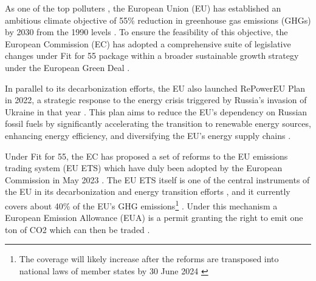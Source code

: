 \documentclass[preprint, 3p,
authoryear]{elsarticle} %
\begin{document}
As one of the top polluters \citep{unep_emissions_2023}, the European
Union (EU) has established an ambitious climate objective of 55\%
reduction in greenhouse gas emissions (GHGs) by 2030 from the 1990
levels \citep[Art 4(1)]{regulation_2021_1119}. To ensure the feasibility
of this objective, the European Commission (EC) has adopted a
comprehensive suite of legislative changes under Fit for 55 package
within a broader sustainable growth strategy under the European Green
Deal \citep{delivering_2021}.

In parallel to its decarbonization efforts, the EU also launched
RePowerEU Plan in 2022, a strategic response to the energy crisis
triggered by Russia's invasion of Ukraine in that year
\citep{communication_2022}. This plan aims to reduce the EU's dependency
on Russian fossil fuels by significantly accelerating the transition to
renewable energy sources, enhancing energy efficiency, and diversifying
the EU's energy supply chains \citep[1-5]{communication_2022}.

Under Fit for 55, the EC has proposed a set of reforms to the EU
emissions trading system (EU ETS) which have duly been adopted by the
European Commission in May 2023 \citep{directive_2023_959}. The EU ETS
itself is one of the central instruments of the EU in its
decarbonization and energy transition efforts
\citep{decision_2015_1814, bai_drivers_2023}, and it currently covers
about 40\% of the EU's GHG
emissions\footnote{The coverage will likely increase after the reforms are transposed into national laws of member states by 30 June 2024 \citep{directive_2023_959}}
\citep{eu_ets}. Under this mechanism a European Emission Allowance (EUA)
is a permit granting the right to emit one ton of CO2 which can then be
traded \citep{directive_2003_87}.
\end{document}
